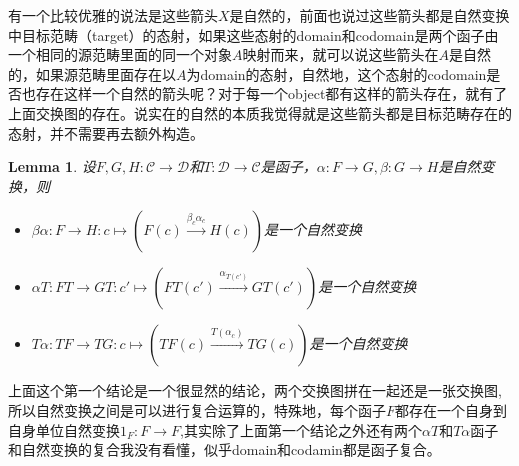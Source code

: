 \documentclass[UTF8,11pt,a4paper]{ctexart}
\newtheorem{lemma}[theorem]{Lemma}
\begin{document}
有一个比较优雅的说法是这些箭头$X$是自然的，前面也说过这些箭头都是自然变换中目标范畴（target）的态射，如果这些态射的domain和codomain是两个函子由一个相同的源范畴里面的同一个对象$A$映射而来，就可以说这些箭头在$A$是自然的，如果源范畴里面存在以$A$为domain的态射，自然地，这个态射的codomain是否也存在这样一个自然的箭头呢？对于每一个object都有这样的箭头存在，就有了上面交换图的存在。说实在的自然的本质我觉得就是这些箭头都是目标范畴存在的态射，并不需要再去额外构造。

\begin{lemma}
设$F,G,H \colon \mathcal{C} \rightarrow \mathcal{D}$和$T \colon \mathcal{D} \rightarrow \mathcal{C}$是函子，$\alpha \colon F \rightarrow G, \beta \colon G \rightarrow H$是自然变换，则
\begin{itemize}
 \item $\beta\alpha \colon F \rightarrow H \colon c \mapsto(F(c) \xrightarrow{\beta_c\alpha_c} H(c))$是一个自然变换
 \begin{center}
 \end{center}
	\item $\alpha T \colon FT \rightarrow GT \colon c' \mapsto (FT(c') \xrightarrow{\alpha_{T(c')}} GT(c'))$是一个自然变换
	\item $T\alpha \colon TF \rightarrow TG \colon c \mapsto (TF(c) \xrightarrow{T(\alpha_{c})} TG(c))$是一个自然变换
\end{itemize}
\end{lemma}


上面这个第一个结论是一个很显然的结论，两个交换图拼在一起还是一张交换图,所以自然变换之间是可以进行复合运算的，特殊地，每个函子$F$都存在一个自身到自身单位自然变换$1_F \colon F \rightarrow F$,其实除了上面第一个结论之外还有两个$\alpha T$和$T\alpha$函子和自然变换的复合我没有看懂，似乎domain和codamin都是函子复合。
\end{document}
